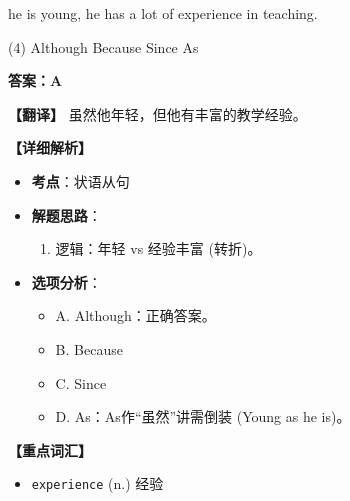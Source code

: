 \documentclass[11pt, a4paper]{article}
\newcommand{\analysis}[4]{
    \begin{solutionbox}
        \textbf{答案：#1}
        
        \textbf{【翻译】} #2
        
        \textbf{【详细解析】}
        #3
        
        \textbf{【重点词汇】}
        #4
    \end{solutionbox}
}
\newcommand{\blank}{\underline{\hspace{1.5cm}}}
\begin{document}
\begin{questions}
    \item \blank he is young, he has a lot of experience in teaching.
    \begin{tasks}(4)
        \task Although \task Because \task Since \task As
    \end{tasks}
    \analysis{A}{虽然他年轻，但他有丰富的教学经验。}{
        \begin{itemize}
            \item \textbf{考点}：状语从句
            \item \textbf{解题思路}：
                \begin{enumerate}
                    \item 逻辑：年轻 vs 经验丰富 (转折)。
                \end{enumerate}
            \item \textbf{选项分析}：
                \begin{itemize}
                    \item A. Although：正确答案。
                    \item B. Because
                    \item C. Since
                    \item D. As：As作“虽然”讲需倒装 (Young as he is)。
                \end{itemize}
        \end{itemize}
    }{
        \begin{itemize}
            \item \texttt{experience} (n.) 经验
        \end{itemize}
    }
\end{questions}

\end{document}
